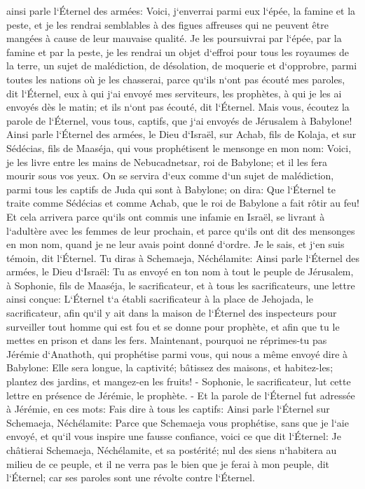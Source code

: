 \verse ainsi parle l`Éternel des armées: Voici, j`enverrai parmi eux l`épée, la famine et la peste, et je les rendrai semblables à des figues affreuses qui ne peuvent être mangées à cause de leur mauvaise qualité. 
\verse Je les poursuivrai par l`épée, par la famine et par la peste, je les rendrai un objet d`effroi pour tous les royaumes de la terre, un sujet de malédiction, de désolation, de moquerie et d`opprobre, parmi toutes les nations où je les chasserai, 
\verse parce qu`ils n`ont pas écouté mes paroles, dit l`Éternel, eux à qui j`ai envoyé mes serviteurs, les prophètes, à qui je les ai envoyés dès le matin; et ils n`ont pas écouté, dit l`Éternel. 
\verse Mais vous, écoutez la parole de l`Éternel, vous tous, captifs, que j`ai envoyés de Jérusalem à Babylone! 
\verse Ainsi parle l`Éternel des armées, le Dieu d`Israël, sur Achab, fils de Kolaja, et sur Sédécias, fils de Maaséja, qui vous prophétisent le mensonge en mon nom: Voici, je les livre entre les mains de Nebucadnetsar, roi de Babylone; et il les fera mourir sous vos yeux. 
\verse On se servira d`eux comme d`un sujet de malédiction, parmi tous les captifs de Juda qui sont à Babylone; on dira: Que l`Éternel te traite comme Sédécias et comme Achab, que le roi de Babylone a fait rôtir au feu! 
\verse Et cela arrivera parce qu`ils ont commis une infamie en Israël, se livrant à l`adultère avec les femmes de leur prochain, et parce qu`ils ont dit des mensonges en mon nom, quand je ne leur avais point donné d`ordre. Je le sais, et j`en suis témoin, dit l`Éternel. 
\verse Tu diras à Schemaeja, Néchélamite: 
\verse Ainsi parle l`Éternel des armées, le Dieu d`Israël: Tu as envoyé en ton nom à tout le peuple de Jérusalem, à Sophonie, fils de Maaséja, le sacrificateur, et à tous les sacrificateurs, une lettre ainsi conçue: 
\verse L`Éternel t`a établi sacrificateur à la place de Jehojada, le sacrificateur, afin qu`il y ait dans la maison de l`Éternel des inspecteurs pour surveiller tout homme qui est fou et se donne pour prophète, et afin que tu le mettes en prison et dans les fers. 
\verse Maintenant, pourquoi ne réprimes-tu pas Jérémie d`Anathoth, qui prophétise parmi vous, 
\verse qui nous a même envoyé dire à Babylone: Elle sera longue, la captivité; bâtissez des maisons, et habitez-les; plantez des jardins, et mangez-en les fruits! - 
\verse Sophonie, le sacrificateur, lut cette lettre en présence de Jérémie, le prophète. - 
\verse Et la parole de l`Éternel fut adressée à Jérémie, en ces mots: 
\verse Fais dire à tous les captifs: Ainsi parle l`Éternel sur Schemaeja, Néchélamite: Parce que Schemaeja vous prophétise, sans que je l`aie envoyé, et qu`il vous inspire une fausse confiance, 
\verse voici ce que dit l`Éternel: Je châtierai Schemaeja, Néchélamite, et sa postérité; nul des siens n`habitera au milieu de ce peuple, et il ne verra pas le bien que je ferai à mon peuple, dit l`Éternel; car ses paroles sont une révolte contre l`Éternel. 

